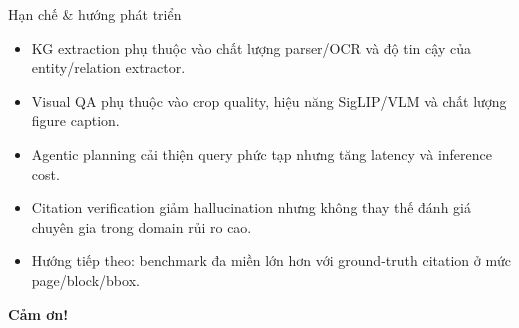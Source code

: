 \documentclass[aspectratio=169,11pt]{beamer}
\begin{document}
\begin{frame}{Hạn chế \& hướng phát triển}
\small
\begin{itemize}
  \item KG extraction phụ thuộc vào chất lượng parser/OCR và độ tin cậy của entity/relation extractor.
  \item Visual QA phụ thuộc vào crop quality, hiệu năng SigLIP/VLM và chất lượng figure caption.
  \item Agentic planning cải thiện query phức tạp nhưng tăng latency và inference cost.
  \item Citation verification giảm hallucination nhưng không thay thế đánh giá chuyên gia trong domain rủi ro cao.
  \item Hướng tiếp theo: benchmark đa miền lớn hơn với ground-truth citation ở mức page/block/bbox.
\end{itemize}
\end{frame}

\begin{frame}[plain]
\vfill
\begin{center}
{\color{ABDeepBlue}\fontsize{38}{44}\selectfont\bfseries Cảm ơn!\par}
\end{center}
\vfill
\end{frame}
\end{document}
